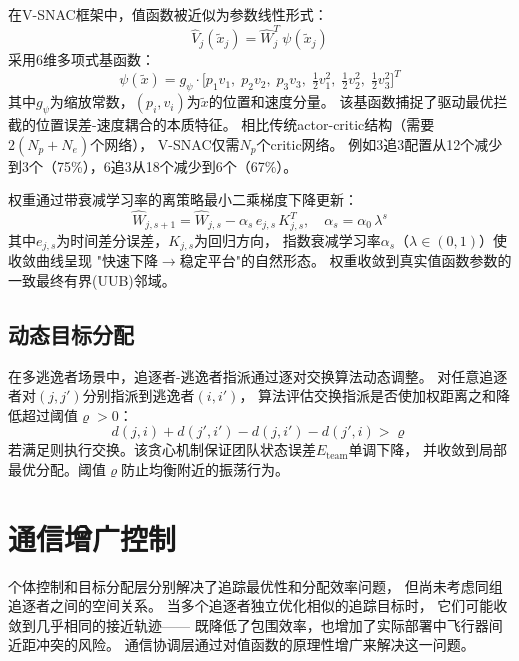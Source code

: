 \documentclass[conference]{IEEEtran}
\begin{document}
在V-SNAC框架\cite{b_xu2024}中，值函数被近似为参数线性形式：
\begin{equation}\label{eq:vsnac}
\hat{V}_j(\tilde{x}_j) = \hat{W}_j^T\,\psi(\tilde{x}_j)
\end{equation}
采用6维多项式基函数：
\begin{equation}\label{eq:basis}
\psi(\tilde{x}) = g_\psi\!\cdot\!\big[p_1 v_1,\; p_2 v_2,\; p_3 v_3,\; \tfrac{1}{2}v_1^2,\; \tfrac{1}{2}v_2^2,\; \tfrac{1}{2}v_3^2\big]^T
\end{equation}
其中$g_\psi$为缩放常数，$(p_i, v_i)$为$\tilde{x}$的位置和速度分量。
该基函数捕捉了驱动最优拦截的位置误差-速度耦合的本质特征。
相比传统actor-critic结构（需要$2(N_p + N_e)$个网络），
V-SNAC仅需$N_p$个critic网络。
例如3追3配置从12个减少到3个（75\%），6追3从18个减少到6个（67\%）。

权重通过带衰减学习率的离策略最小二乘梯度下降更新：
\begin{equation}\label{eq:weight_update}
\hat{W}_{j,s+1} = \hat{W}_{j,s} - \alpha_s\,e_{j,s}\,K_{j,s}^T, \quad \alpha_s = \alpha_0\,\lambda^s
\end{equation}
其中$e_{j,s}$为时间差分误差，$K_{j,s}$为回归方向，
指数衰减学习率$\alpha_s$（$\lambda \in (0,1)$）使收敛曲线呈现
"快速下降$\to$稳定平台"的自然形态。
权重收敛到真实值函数参数的一致最终有界(UUB)邻域\cite{b_lewis1998}。

\subsection{动态目标分配}

在多逃逸者场景中，追逐者-逃逸者指派通过逐对交换算法动态调整\cite{b_graphswap,b_xu2024}。
对任意追逐者对$(j, j')$分别指派到逃逸者$(i, i')$，
算法评估交换指派是否使加权距离之和降低超过阈值$\varrho > 0$：
\begin{equation}\label{eq:swap}
d(j,i) + d(j',i') - d(j,i') - d(j',i) > \varrho
\end{equation}
若满足则执行交换。该贪心机制保证团队状态误差$E_{\mathrm{team}}$单调下降，
并收敛到局部最优分配。阈值$\varrho$防止均衡附近的振荡行为。


\section{通信增广控制}

个体控制和目标分配层分别解决了追踪最优性和分配效率问题，
但尚未考虑同组追逐者之间的空间关系。
当多个追逐者独立优化相似的追踪目标时，
它们可能收敛到几乎相同的接近轨迹——
既降低了包围效率，也增加了实际部署中飞行器间近距冲突的风险。
通信协调层通过对值函数的原理性增广来解决这一问题。
\end{document}
